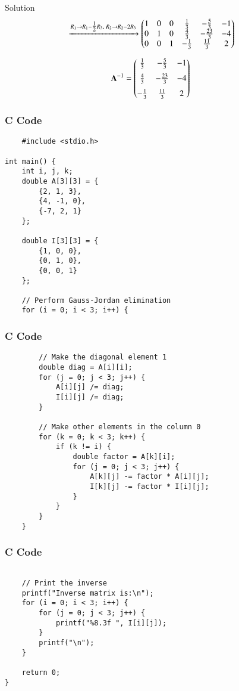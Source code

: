 \documentclass{beamer}
\begin{document}
\begin{frame}{Solution}
\begin{align}
&\xrightarrow{R_1 \to R_1-\tfrac12R_3,\; R_2 \to R_2-2R_3}
\begin{pmatrix}1 & 0 & 0 & \tfrac13 & -\tfrac53 & -1 \\
       0 & 1 & 0 & \tfrac43 & -\tfrac{23}{3} & -4 \\
       0 & 0 & 1 & -\tfrac13 & \tfrac{11}{3} & 2\end{pmatrix}
\end{align}

\begin{align}
\mathbf{A}^{-1} &=
\begin{pmatrix}\tfrac13 & -\tfrac53 & -1 \\[6pt]
       \tfrac43 & -\tfrac{23}{3} & -4 \\[6pt]
       -\tfrac13 & \tfrac{11}{3} & 2\end{pmatrix}
\end{align}
\end{frame}
\begin{frame}[fragile]
    \frametitle{C Code}
    \begin{lstlisting}
    #include <stdio.h>

int main() {
    int i, j, k;
    double A[3][3] = {
        {2, 1, 3},
        {4, -1, 0},
        {-7, 2, 1}
    };

    double I[3][3] = {
        {1, 0, 0},
        {0, 1, 0},
        {0, 0, 1}
    };

    // Perform Gauss-Jordan elimination
    for (i = 0; i < 3; i++) {
    \end{lstlisting}
    \end{frame}
\begin{frame}[fragile]
    \frametitle{C Code}
    \begin{lstlisting}
        // Make the diagonal element 1
        double diag = A[i][i];
        for (j = 0; j < 3; j++) {
            A[i][j] /= diag;
            I[i][j] /= diag;
        }

        // Make other elements in the column 0
        for (k = 0; k < 3; k++) {
            if (k != i) {
                double factor = A[k][i];
                for (j = 0; j < 3; j++) {
                    A[k][j] -= factor * A[i][j];
                    I[k][j] -= factor * I[i][j];
                }
            }
        }
    }
    \end{lstlisting}
    \end{frame}
\begin{frame}[fragile]
    \frametitle{C Code}
    \begin{lstlisting}

    // Print the inverse
    printf("Inverse matrix is:\n");
    for (i = 0; i < 3; i++) {
        for (j = 0; j < 3; j++) {
            printf("%8.3f ", I[i][j]);
        }
        printf("\n");
    }

    return 0;
}
\end{lstlisting}
\end{frame}
\end{document}
